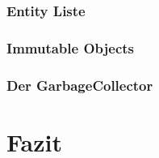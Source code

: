 		\subsubsection{Entity Liste}				
		\subsubsection{Immutable Objects}			
		\subsubsection{Der GarbageCollector}		
\section{Fazit}                                     
